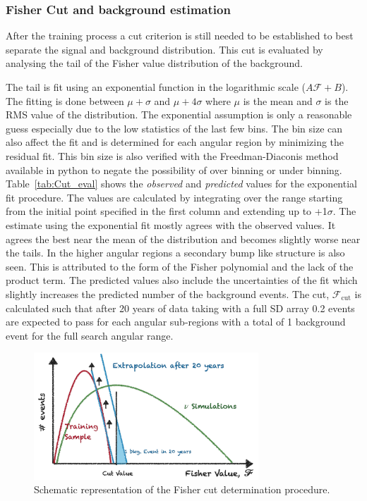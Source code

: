\subsubsection{Fisher Cut and background estimation}
\label{subsubsec:nu_sel_fisher_cut}
After the training process a cut criterion is still needed to be established to best separate the signal and background distribution. This cut is evaluated by analysing the tail of the Fisher value distribution of the background. 

The tail is fit using an exponential function in the logarithmic scale ($A \mathcal{F} + B$). The fitting is done between $\mu + \sigma$ and $\mu + 4\sigma$ where $\mu$ is the mean and $\sigma$ is the RMS value of the distribution. The exponential assumption is only a reasonable guess especially due to the low statistics of the last few bins. The bin size can also affect the fit and is determined for each angular region by minimizing the residual fit. This bin size is also verified with the Freedman-Diaconis method available in python to negate the possibility of over binning or under binning. Table~\ref{tab:Cut_eval} shows the \textit{observed} and \textit{predicted} values for the exponential fit procedure. The values are calculated by integrating over the range starting from the initial point specified in the first column and extending up to +1$\sigma$. The estimate using the exponential fit mostly agrees with the observed values. It agrees the best near the mean of the distribution and becomes slightly worse near the tails. In the higher angular regions a secondary bump like structure is also seen. This is attributed to the form of the Fisher polynomial and the lack of the product term. The predicted values also include the uncertainties of the fit which slightly increases the predicted number of the background events. The cut, $\mathcal{F}_{\text{cut}}$ is calculated such that after 20 years of data taking with a full SD array 0.2 events are expected to pass for each angular sub-regions with a total of 1 background event for the full search angular range. 

\begin{figure}[t!]
  \centering
  \includegraphics[width=0.75\textwidth]{thesis_figures/Nu_analysis/Fisher_cut_schematic.pdf}
  \caption{Schematic representation of the Fisher cut determination procedure.}
  \label{fig:Fish_cut_schem}
\end{figure}

